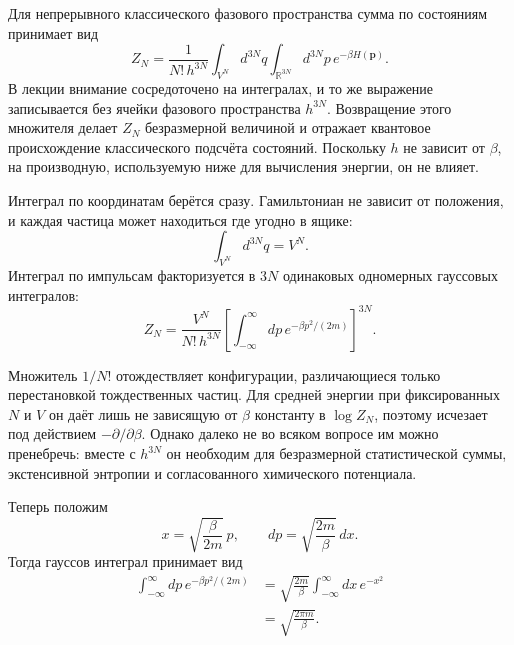 \begin{classroomqa}
\end{classroomqa}

Для непрерывного классического фазового пространства сумма по состояниям принимает вид
\begin{equation}
 Z_N
 =\frac{1}{N!\,h^{3N}}
 \int_{V^N}d^{3N}q
 \int_{\mathbb R^{3N}}d^{3N}p\,
 e^{-\beta H(\bm p)}.
 \label{eq:sm4-classical-partition}
\end{equation}
В лекции внимание сосредоточено на интегралах, и то же выражение записывается без ячейки фазового пространства \(h^{3N}\). Возвращение этого множителя делает \(Z_N\) безразмерной величиной и отражает квантовое происхождение классического подсчёта состояний. Поскольку \(h\) не зависит от \(\beta\), на производную, используемую ниже для вычисления энергии, он не влияет.

Интеграл по координатам берётся сразу. Гамильтониан не зависит от положения, и каждая частица может находиться где угодно в ящике:
\begin{equation}
 \int_{V^N}d^{3N}q=V^N.
\end{equation}
Интеграл по импульсам факторизуется в \(3N\) одинаковых одномерных гауссовых интегралов:
\begin{equation}
 Z_N
 =\frac{V^N}{N!\,h^{3N}}
 \left[
  \int_{-\infty}^{\infty}dp\,
  e^{-\beta p^2/(2m)}
 \right]^{3N}.
 \label{eq:sm4-factorized-gas}
\end{equation}

Множитель \(1/N!\) отождествляет конфигурации, различающиеся только перестановкой тождественных частиц. Для средней энергии при фиксированных \(N\) и \(V\) он даёт лишь не зависящую от \(\beta\) константу в \(\log Z_N\), поэтому исчезает под действием \(-\partial/\partial\beta\). Однако далеко не во всяком вопросе им можно пренебречь: вместе с \(h^{3N}\) он необходим для безразмерной статистической суммы, экстенсивной энтропии и согласованного химического потенциала.

Теперь положим
\begin{equation}
 x=\sqrt{\frac{\beta}{2m}}\,p,
 \qquad
 dp=\sqrt{\frac{2m}{\beta}}\,dx.
\end{equation}
Тогда гауссов интеграл принимает вид
\begin{align}
 \int_{-\infty}^{\infty}dp\,e^{-\beta p^2/(2m)}
 &=
 \sqrt{\frac{2m}{\beta}}
 \int_{-\infty}^{\infty}dx\,e^{-x^2}\\
 &=\sqrt{\frac{2\pi m}{\beta}}.
 \label{eq:sm4-gaussian}
\end{align}

